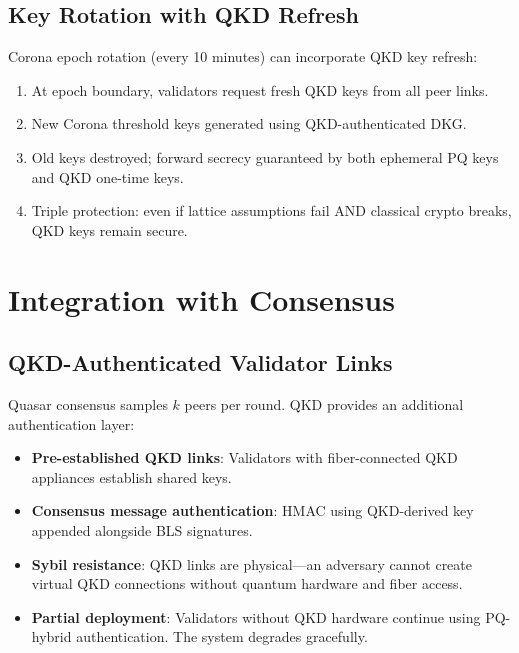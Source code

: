 \documentclass[11pt,letterpaper]{article}
\begin{document}
\subsection{Key Rotation with QKD Refresh}

Corona epoch rotation (every 10 minutes) can incorporate QKD key refresh:

\begin{enumerate}
\item At epoch boundary, validators request fresh QKD keys from all peer links.
\item New Corona threshold keys generated using QKD-authenticated DKG.
\item Old keys destroyed; forward secrecy guaranteed by both ephemeral PQ keys and QKD one-time keys.
\item Triple protection: even if lattice assumptions fail AND classical crypto breaks, QKD keys remain secure.
\end{enumerate}

\section{Integration with Consensus}

\subsection{QKD-Authenticated Validator Links}

Quasar consensus samples $k$ peers per round. QKD provides an additional authentication layer:

\begin{itemize}
\item \textbf{Pre-established QKD links}: Validators with fiber-connected QKD appliances establish shared keys.
\item \textbf{Consensus message authentication}: HMAC using QKD-derived key appended alongside BLS signatures.
\item \textbf{Sybil resistance}: QKD links are physical---an adversary cannot create virtual QKD connections without quantum hardware and fiber access.
\item \textbf{Partial deployment}: Validators without QKD hardware continue using PQ-hybrid authentication. The system degrades gracefully.
\end{itemize}
\end{document}
